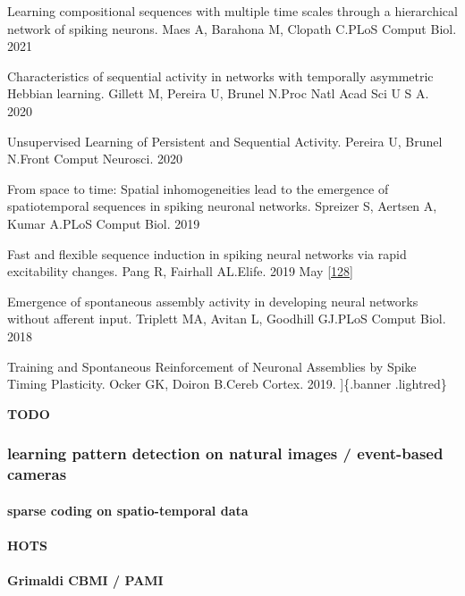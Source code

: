 Learning compositional sequences with multiple time scales through a hierarchical network of spiking neurons.
Maes A, Barahona M, Clopath C.PLoS Comput Biol. 2021

Characteristics of sequential activity in networks with temporally asymmetric Hebbian learning.
Gillett M, Pereira U, Brunel N.Proc Natl Acad Sci U S A. 2020

Unsupervised Learning of Persistent and Sequential Activity.
Pereira U, Brunel N.Front Comput Neurosci. 2020

From space to time: Spatial inhomogeneities lead to the emergence of spatiotemporal sequences in spiking neuronal networks.
Spreizer S, Aertsen A, Kumar A.PLoS Comput Biol. 2019

Fast and flexible sequence induction in spiking neural networks via rapid excitability changes.
Pang R, Fairhall AL.Elife. 2019 May {[}\protect\hyperlink{ref-12zyUFdO4}{128}{]}

Emergence of spontaneous assembly activity in developing neural networks without afferent input.
Triplett MA, Avitan L, Goodhill GJ.PLoS Comput Biol. 2018

Training and Spontaneous Reinforcement of Neuronal Assemblies by Spike Timing Plasticity.
Ocker GK, Doiron B.Cereb Cortex. 2019.
{]}\{.banner .lightred\}

\textbf{TODO}

\hypertarget{learning-pattern-detection-on-natural-images-event-based-cameras}{%
\subsubsection{learning pattern detection on natural images / event-based cameras}\label{learning-pattern-detection-on-natural-images-event-based-cameras}}

\hypertarget{sparse-coding-on-spatio-temporal-data}{%
\paragraph{sparse coding on spatio-temporal data}\label{sparse-coding-on-spatio-temporal-data}}

\hypertarget{hots}{%
\paragraph{HOTS}\label{hots}}

\hypertarget{grimaldi-cbmi-pami}{%
\paragraph{Grimaldi CBMI / PAMI}\label{grimaldi-cbmi-pami}}

